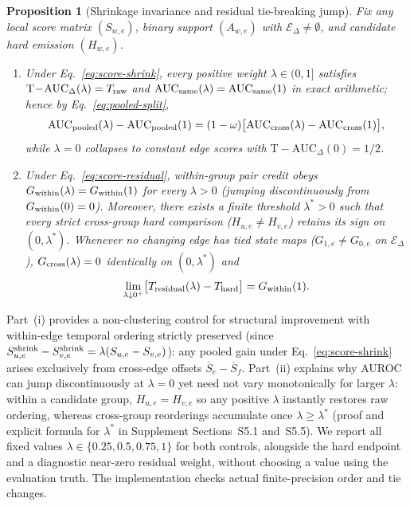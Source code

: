 \documentclass[11pt]{article}
\newcommand{\Tauc}{\mathrm{T\!-\!AUC}_{\Delta}}
\newtheorem{proposition}{Proposition}
\begin{document}
\begin{proposition}[Shrinkage invariance and residual tie-breaking jump]
\label{prop:emission-controls}
Fix any local score matrix $(S_{w,e})$, binary support $(A_{w,e})$ with
$\mathcal E_\Delta\neq\emptyset$, and candidate hard emission $(H_{w,e})$.
\begin{enumerate}
\item[(i)] Under Eq.~\eqref{eq:score-shrink}, every positive weight
$\lambda\in(0,1]$ satisfies $\Tauc(\lambda)=T_{\rm raw}$ and
$\mathrm{AUC}_{\rm same}(\lambda)=\mathrm{AUC}_{\rm same}(1)$ in exact
arithmetic; hence by Eq.~\eqref{eq:pooled-split},
\begin{equation*}
\mathrm{AUC}_{\rm pooled}(\lambda)-\mathrm{AUC}_{\rm pooled}(1)
=(1-\omega)\bigl[\mathrm{AUC}_{\rm cross}(\lambda)-\mathrm{AUC}_{\rm cross}(1)\bigr],
\end{equation*}
while $\lambda=0$ collapses to constant edge scores with $\Tauc(0)=1/2$.
\item[(ii)] Under Eq.~\eqref{eq:score-residual}, within-group pair credit obeys
$G_{\rm within}(\lambda)=G_{\rm within}(1)$ for every $\lambda>0$ (jumping
discontinuously from $G_{\rm within}(0)=0$). Moreover, there exists a finite
threshold $\lambda^*>0$ such that every strict cross-group hard comparison
($H_{u,e}\neq H_{v,e}$) retains its sign on $(0,\lambda^*)$. Whenever no
changing edge has tied state maps ($G_{1,e}\neq G_{0,e}$ on $\mathcal E_\Delta$),
$G_{\rm cross}(\lambda)=0$ identically on $(0,\lambda^*)$ and
\begin{equation*}
\lim_{\lambda\downarrow 0^+}\bigl[T_{\rm residual}(\lambda)-T_{\rm hard}\bigr]
=G_{\rm within}(1).
\end{equation*}
\end{enumerate}
\end{proposition}

Part~(i) provides a non-clustering control for structural improvement with
within-edge temporal ordering strictly preserved (since
$S^{\rm shrink}_{u,e}-S^{\rm shrink}_{v,e}=\lambda(S_{u,e}-S_{v,e})$): any
pooled gain under Eq.~\eqref{eq:score-shrink} arises exclusively from cross-edge
offsets $\overline S_e-\overline S_f$. Part~(ii) explains why AUROC can jump
discontinuously at $\lambda=0$ yet need not vary monotonically for larger
$\lambda$: within a candidate group, $H_{u,e}=H_{v,e}$ so any positive $\lambda$
instantly restores raw ordering, whereas cross-group reorderings accumulate once
$\lambda\ge\lambda^*$ (proof and explicit formula for $\lambda^*$ in Supplement
Sections~S5.1 and~S5.5).
We report all fixed values $\lambda\in\{0.25,0.5,0.75,1\}$ for both controls,
alongside the hard endpoint and a diagnostic near-zero residual weight,
without choosing a value using the evaluation truth. The implementation checks
actual finite-precision order and tie changes.
\end{document}

